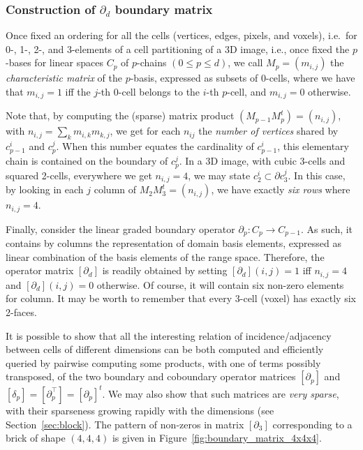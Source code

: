 \subsubsection{Construction of $\partial_d$ boundary matrix}

Once fixed an ordering for all the cells (vertices, edges, pixels, and voxels), i.e.~for 0-, 1-, 2-, and 3-elements of a cell partitioning of a 3D image, i.e., once fixed the $p$-bases for linear spaces $C_p$ of $p$-chains $(0\leq p\leq d)$, we call $M_p = (m_{i,j})$ the \emph{characteristic matrix} of the $p$-basis, expressed as subsets of 0-cells, where  we have that $m_{i,j}=1$ iff the $j$-th $0$-cell belongs to the $i$-th $p$-cell, and $m_{i,j}=0$ otherwise.  

Note that, by computing the (sparse) matrix product $(M_{p-1} M_{p}^t) = (n_{i,j})$, with $n_{i,j} = \sum_{k} m_{i,k}m_{k,j}$, we get for each $n_{ij}$ the \emph{number of vertices} shared by $c_{p-1}^i$ and $c_{p}^j$. When this number equates the cardinality of $c_{p-1}^i$, this elementary chain is contained on the boundary of $c_{p}^j$. In a 3D image, with cubic 3-cells and squared 2-cells, everywhere we get $n_{i,j}=4$, we may state $c_{2}^i\subset\partial c_{3}^j$. In this case, by looking in each $j$ column of $M_{2} M_{3}^t = (n_{i,j})$, we have exactly \emph{six rows} where  $n_{i,j} = 4$. 

Finally, consider the linear graded boundary operator $\partial_p : C_p \to C_{p-1}$. As such, it contains by columns the representation of domain basis elements, expressed as linear combination of the basis elements of the range space. Therefore, the operator matrix $[\partial_d]$ is readily obtained by setting $[\partial_d](i,j)=1$ iff $n_{i,j}=4$ and $[\partial_d](i,j)=0$ otherwise.  Of course, it will contain six non-zero elements for column.  It may be worth to remember that every 3-cell (voxel) has exactly six 2-faces. 

It is possible to show that all the interesting relation of incidence/adjacency between cells of different dimensions can be both computed and efficiently queried by pairwise computing some products, with one of terms possibly transposed, of the two boundary and coboundary operator matrices $[\partial_p]$ and $[\delta_p] = [\partial_p^\top] = [\partial_p]^t$. We may also show that such matrices are \emph{very sparse}, with their sparseness growing rapidly with the dimensions (see Section~\ref{sec:block}). The pattern of non-zeros in matrix $[\partial_3]$ corresponding to a brick of shape $(4,4,4)$ is given in Figure~\ref{fig:boundary_matrix_4x4x4}.

